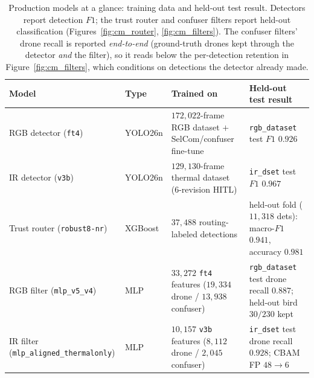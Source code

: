 \begin{table}[htbp]
    \centering
    \caption{Production models at a glance: training data and held-out test result. Detectors report detection $F1$; the trust router and confuser filters report held-out classification (Figures~\ref{fig:cm_router}, \ref{fig:cm_filters}). The confuser filters' drone recall is reported \emph{end-to-end} (ground-truth drones kept through the detector \emph{and} the filter), so it reads below the per-detection retention in Figure~\ref{fig:cm_filters}, which conditions on detections the detector already made.}
    \label{tab:model_overview}
    \footnotesize
    \begin{tabular}{@{}p{2.9cm} l p{3.9cm} p{4.4cm}@{}}
        \toprule
        Model & Type & Trained on & Held-out test result \\
        \midrule
        RGB detector (\texttt{ft4}) & YOLO26n & $172{,}022$-frame RGB dataset $+$ SelCom/confuser fine-tune & \texttt{rgb\_dataset} test $F1$ $0.926$ \\
        \addlinespace
        IR detector (\texttt{v3b}) & YOLO26n & $129{,}130$-frame thermal dataset (6-revision HITL) & \texttt{ir\_dset} test $F1$ $0.967$ \\
        \addlinespace
        Trust router (\texttt{robust8-nr}) & XGBoost & $37{,}488$ routing-labeled detections & held-out fold ($11{,}318$ dets): macro-$F1$ $0.941$, accuracy $0.981$ \\
        \addlinespace
        RGB filter (\texttt{mlp\_v5\_v4}) & MLP & $33{,}272$ \texttt{ft4} features ($19{,}334$ drone / $13{,}938$ confuser) & \texttt{rgb\_dataset} test drone recall $0.887$; held-out bird $30/230$ kept \\
        \addlinespace
        IR filter (\texttt{mlp\_aligned\_\allowbreak thermalonly}) & MLP & $10{,}157$ \texttt{v3b} features ($8{,}112$ drone / $2{,}045$ confuser) & \texttt{ir\_dset} test drone recall $0.928$; CBAM FP $48\to6$ \\
        \bottomrule
    \end{tabular}
\end{table}

